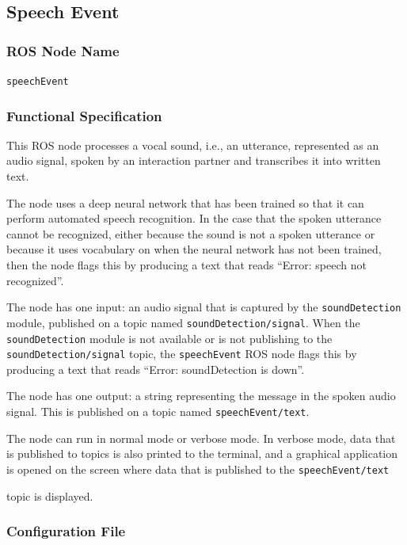 \documentclass{CSSRforAfrica}
\begin{document}
{{\newpage

\subsection{Speech Event }

\subsubsection*{ROS Node Name}
 {\small \verb+speechEvent+}   

\subsubsection*{Functional Specification}
This ROS node processes a vocal sound, i.e., an utterance, represented as an audio signal, spoken by an interaction partner and transcribes it into written text.

The node uses a deep neural network that has been trained so that it can perform automated speech recognition.  In the case that the spoken utterance cannot be recognized, either because the sound is not a spoken utterance or because it uses vocabulary on when the neural network has not been trained, then the node flags this by producing a text that reads ``Error: speech not recognized''.  
 
The node has one input: an audio signal that is captured by the  {\small \verb+soundDetection+} module, published on a  topic named  {\small \verb+soundDetection/signal+}. When the {\small \verb+soundDetection+} module is not available or is not publishing  to the  {\small \verb+soundDetection/signal+} topic, the  {\small \verb+speechEvent+} ROS node flags this by producing a text that reads ``Error: soundDetection is down''.
 
The node has one output: a string representing the message in the spoken audio signal. This is published on a  topic named  {\small \verb+speechEvent/text+}.

The node can run in normal mode or verbose mode. In verbose mode, data that is published to topics is also printed to the terminal, and a graphical application is opened on the screen where data that is published to the  \verb+speechEvent/text+} topic is displayed.

\subsubsection*{Configuration File}

}
\end{document}
